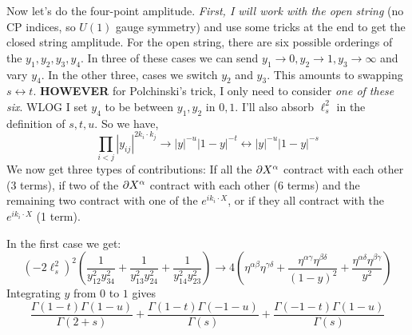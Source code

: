 \documentclass[11pt, class=article, crop=false]{standalone}
\begin{document}
\begin{enumerate}
	Now let's do the four-point amplitude. \emph{First, I will work with the open string} (no CP indices, so $U(1)$ gauge symmetry) and use some tricks at the end to get the closed string amplitude. For the open string, there are six possible orderings of the $y_1, y_2, y_3, y_4$. In three of these cases we can send $y_1\to 0, y_2 \to 1, y_3 \to \infty$ and vary $y_4$. In the other three, cases we switch $y_2$ and $y_3$. This amounts to swapping $s\leftrightarrow t$. \textbf{HOWEVER} for Polchinski's trick, I only need to consider \emph{one of these six}. WLOG I set $y_4$ to be between $y_1, y_2$ in $0,1$.
	I'll also absorb $\ell_s^2$ in the definition of $s,t,u$. So we have,
	\[
		\prod_{i<j} |y_{ij}|^{2 k_i \cdot k_j} \to |y|^{-u} |1-y|^{-t} \leftrightarrow |y|^{-u} |1-y|^{- s}
	\]
	We now get three types of contributions: If all the $\partial X^\alpha$ contract with each other (3 terms), if two of the $\partial X^\alpha$ contract with each other (6 terms) and the remaining two contract with one of the $e^{i k_i \cdot X}$, or if they all contract with the $e^{i k_i \cdot X}$ (1 term). 

	In the first case we get:
	\[
		\left(-2 \ell_s^2\right)^2 \left(\frac{1}{y_{12}^2 y_{34}^2} + \frac{1}{y_{13}^2 y_{24}^2} + \frac{1}{y_{14}^2 y_{23}^2} \right) \to 4 \left(\eta^{\alpha \beta} \eta^{\gamma \delta} + \frac{\eta^{\alpha \gamma} \eta^{\beta \delta}}{(1-y)^{2}} + \frac{\eta^{\alpha \delta} \eta^{\beta \gamma}}{y^{2}} \right)  %
	\]
	Integrating $y$ from $0$ to $1$ gives
	\begin{equation}\label{eq:part1}
		\frac{\Gamma(1-t) \Gamma(1-u)}{\Gamma(2+s)} + \frac{\Gamma(1-t) \Gamma(-1-u)}{\Gamma(s)} + \frac{\Gamma(-1-t) \Gamma(1-u)}{\Gamma(s)}		
	\end{equation}

	

\end{enumerate}
\end{document}
